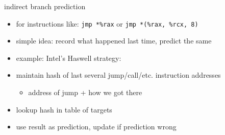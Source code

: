 \begin{frame}{indirect branch prediction}
    \begin{itemize}
        \item for instructions like: \texttt{jmp *\%rax} or \texttt{jmp *(\%rax, \%rcx, 8)}
        \item simple idea: record what happened last time, predict the same
        \item example: Intel's Haswell strategy:
        \vspace{.5cm}
        \item maintain hash of last several jump/call/etc. instruction addresses
            \begin{itemize}
            \item address of jump + how we got there
            \end{itemize}
        \item lookup hash in table of targets
        \item use result as prediction, update if prediction wrong
    \end{itemize}
\end{frame}
